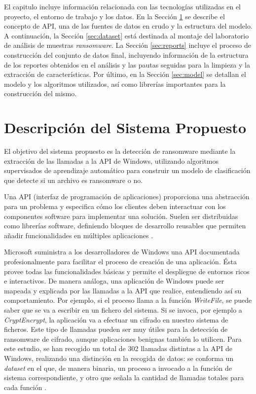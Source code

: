 \noindent El capitulo incluye información relacionada con las tecnologías utilizadas en el proyecto, el entorno de trabajo y los datos. En la Sección \ref{sec:sistema} se describe el concepto de \gls{API}, una de las fuentes de datos en crudo y la estructura del modelo. A continuación, la Sección \ref{sec:dataset} está destinada al montaje del laboratorio de análisis de muestras \textit{ransomware}. La Sección \ref{sec:reports} incluye el proceso de construcción del conjunto de datos final, incluyendo información de la estructura de los reportes obtenidos en el análisis y las pautas seguidas para la limpieza y la extracción de características. Por último, en la Sección \ref{sec:model} se detallan el modelo y los algoritmos utilizados, así como librerías importantes para la construcción del mismo.

\section{Descripción del Sistema Propuesto} \label{sec:sistema}

\noindent El objetivo del sistema propuesto es la detección de ransomware mediante la extracción de las llamadas a la \gls{API} de Windows, utilizando algoritmos supervisados de aprendizaje automático para construir un modelo de clasificación que detecte si un archivo es ransomware o no.



Una \gls{API} (interfaz de programación de aplicaciones) proporciona una abstracción para un problema y especifica cómo los clientes deben interactuar con los componentes software para implementar una solución. Suelen ser distribuidas como librerías software, definiendo bloques de desarrollo reusables que permiten añadir funcionalidades en múltiples aplicaciones \cite{reddy2011api}. 

Microsoft suministra a los desarrolladores de Windows una \gls{API} documentada profesionalmente para facilitar el proceso de creación de una aplicación. Ésta provee todas las funcionalidades básicas y permite el despliegue de entornos ricos e interactivos. De manera análoga, una aplicación de Windows puede ser mapeada y explicada por las llamadas a la {API} que realice, entendiendo así su comportamiento. Por ejemplo, si el proceso llama a la función \textit{WriteFile}, se puede saber que se va a escribir en un fichero del sistema. Si se invoca, por ejemplo a \textit{CryptEncrypt}, la aplicación va a efectuar un cifrado en nuestro sistema de ficheros. Este tipo de llamadas pueden ser muy útiles para la detección de ransomware de cifrado, aunque aplicaciones benignas también lo utilicen. Para este estudio, se han recogido un total de 302 llamadas distintas a la \gls{API} de Windows, realizando una distinción en la recogida de datos: se conforma un \textit{dataset} en el que, de manera binaria, un proceso a invocado a la función de sistema correspondiente, y otro que señala la cantidad de llamadas totales para cada función \cite{10.1145/1654988.1655003}.


